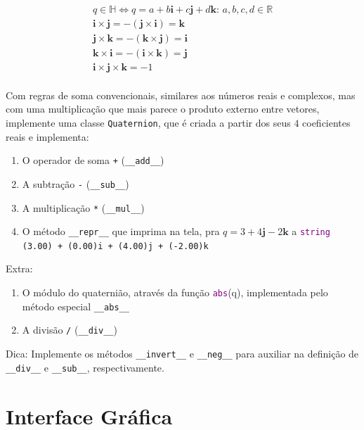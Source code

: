 \documentclass[12pt]{article}
\newcommand{\mono}[1]{\texttt{#1}}
\newcommand{\type}[1]{\textcolor{purple}{\mono{#1}}}
\newcommand{\mb}[1]{\mathbf{#1}}
\newcommand{\spm}[1]{\mono{\_\_#1\_\_}}
\begin{document}
	\[	
	\begin{gathered}
	q \in \mathbb{H} \iff q = a + b \mb{i} + c \mb{j} + d \mb{k} : \, a,b,c,d \in \mathbb{R}\\
	\mb{i} \times \mb{j} = -(\mb{j} \times \mb{i}) = \mb{k}\\
	\mb{j} \times \mb{k} = -(\mb{k} \times \mb{j}) = \mb{i}\\
	\mb{k} \times \mb{i} = -(\mb{i} \times \mb{k}) = \mb{j}\\
	\mb{i} \times \mb{j} \times \mb{k} = -1 \nonumber	
	\end{gathered}
	\]
	\\
	Com regras de soma convencionais, similares aos números reais e complexos, mas com uma multiplicação que mais parece o produto externo entre vetores, implemente uma classe \mono{Quaternion}, que é criada a partir dos seus $4$ coeficientes reais e implementa:
	\begin{enumerate}
		\item O operador de soma \mono{+} (\spm{add})
		\item A subtração \mono{-} (\spm{sub})
		\item A multiplicação \mono{*} (\spm{mul})
		\item O método \spm{repr} que imprima na tela, pra $q = 3 + 4\mb{j} - 2\mb{k}$ a \type{string} \mono{(3.00) + (0.00)i + (4.00)j + (-2.00)k}
	\end{enumerate}
	
	Extra:
	\begin{enumerate}
		\item O módulo do quaternião, através da função \type{abs}(q), implementada pelo método especial \spm{abs}
		\item A divisão \mono{\slash} (\spm{div})
	\end{enumerate}

	Dica:
	Implemente os métodos \spm{invert} e \spm{neg} para auxiliar na definição de \spm{div} e \spm{sub}, respectivamente.
	
	\pagebreak
	
	\section{Interface Gráfica}
\end{document}
